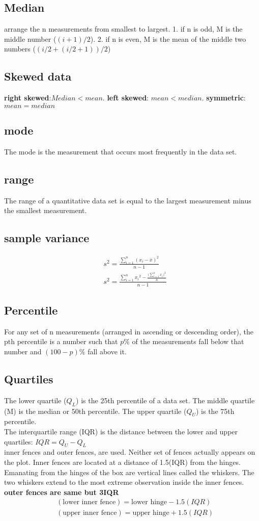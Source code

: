 \documentclass[fontsize=6pt, paper=a4]{scrartcl}
\begin{document}
\begin{multicols*}{4}
\subsection{Median}
arrange the n measurements from smallest to largest. 1. if n is odd, M is the middle number ($(i+1)/2$). 2. if n is even, M is the mean of the middle two numbers ($(i/2+(i/2+1))/2$)
\subsection{Skewed data}
\textbf{right skewed}:$Median < mean$. \textbf{left skewed}: $mean < median$. \textbf{symmetric}: $mean=median$
\subsection{mode}
The mode is the measurement that occurs most frequently in the data set. 
\subsection{range}
The range of a quantitative data set is equal to the largest measurement minus the smallest measurement. 

\subsection{sample variance}
\begin{align}
	&s^2=\frac{\sum_{i=1}^n (x_i-\overline{x})^2}{n-1}\\
	&s^2=\frac{\sum_{i=1}^n {x_i}^2-\frac{\bigg(\sum_{i=1}^n {x_i}\bigg)^2}{n}}{n-1}
\end{align}

\subsection{Percentile}
For any set of n measurements (arranged in ascending or descending order), the pth percentile is a number such that $p\%$ of the measurements fall below that number and $(100 - p)\%$ fall above it. 
\subsection{Quartiles}
The lower quartile ($Q_L$) is the 25th percentile of a data set. The middle quartile (M) is the median or 50th percentile. The upper quartile ($Q_U$) is the 75th percentile. \\ The interquartile range (IQR) is the distance between the lower and upper quartiles: $IQR=Q_U -Q_L $\\inner fences and outer fences, are used. Neither set of fences actually appears on the plot. Inner fences are located at a distance of 1.5(IQR) from the hinges. Emanating from the hinges of the box are vertical lines called the whiskers. The two whiskers extend to the most extreme observation inside the inner fences. \textbf{outer fences are same but 3IQR}
\begin{align}
	&(\textrm{lower inner fence})= \textrm{lower hinge}-1.5(IQR)\\
	&(\textrm{upper inner fence})= \textrm{upper hinge}+1.5(IQR)
\end{align}


\end{multicols*}
\end{document}
